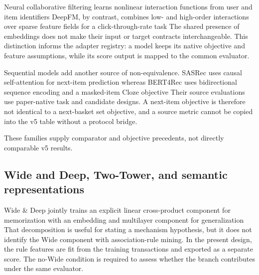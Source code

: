 Neural collaborative filtering learns nonlinear interaction functions from user
and item identifiers
\cite{he2017_ncf} %
DeepFM, by contrast, combines low- and high-order interactions over sparse
feature fields for a click-through-rate task
\cite{guo2017_deepfm} %
The shared presence of embeddings does not make their input or target contracts
interchangeable. This distinction informs the adapter registry: a model keeps
its native objective and feature assumptions, while its score output is mapped
to the common evaluator.

Sequential models add another source of non-equivalence. SASRec uses causal
self-attention for next-item prediction
\cite{kang2018_sasrec} %
whereas BERT4Rec uses bidirectional sequence encoding and a masked-item Cloze
objective
\cite{sun2019_bert4rec} %
Their source evaluations use paper-native task and candidate designs. A next-item
objective is therefore not identical to a next-basket set objective, and a
source metric cannot be copied into the v5 table without a protocol bridge.

These families supply comparator and objective precedents, not directly
comparable v5 results.

\subsection{Wide and Deep, Two-Tower, and semantic representations}

Wide \& Deep jointly trains an explicit linear cross-product component for
memorization with an embedding and multilayer component for generalization
\cite{cheng2016_wide_deep} %
That decomposition is useful for stating a mechanism hypothesis, but it does not
identify the Wide component with association-rule mining. In the present design,
the rule features are fit from the training transactions and exported as a
separate score. The no-Wide condition is required to assess whether the branch
contributes under the same evaluator.

